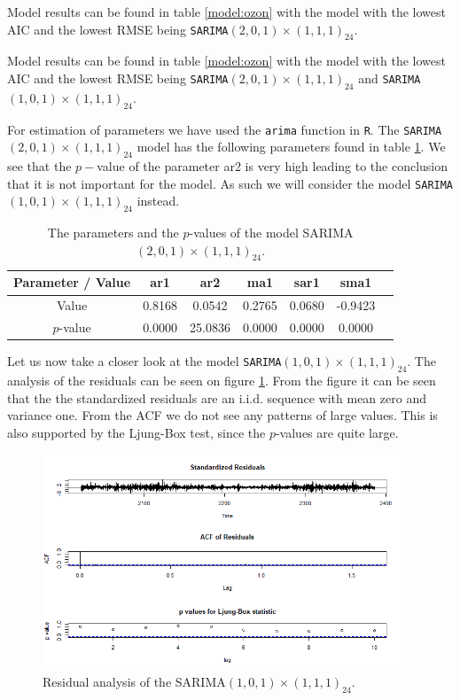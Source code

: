 \documentclass{article}
\begin{document}
Model results can be found in table \ref{model:ozon} with the model with the lowest AIC and the lowest RMSE being \verb|SARIMA|$(2,0,1) \times (1,1,1)_{24}$.

Model results can be found in table \ref{model:ozon} with the model with the lowest AIC and the lowest RMSE being \verb|SARIMA|$(2,0,1) \times (1,1,1)_{24}$ and \verb|SARIMA|$(1,0,1) \times (1,1,1)_{24}$.

For estimation of parameters we have used the \verb|arima| function in \verb|R|.  The \verb|SARIMA|$(2,0,1) \times (1,1,1)_{24}$ model has the following parameters found 
in table \ref{par:ozon}. We see that the $p-$value of the parameter ar2 is very high leading to the 
conclusion that it is not important for the model. As such we will consider the model \verb|SARIMA|$(1,0,1) \times (1,1,1)_{24}$ instead.


\begin{table}[ht!]
    \centering
    \begin{tabular}{|c|c|c|c|c|c|c|} \hline
        Parameter / Value & ar1 & ar2 & ma1 & sar1 & sma1  \\ \hline
        Value & 0.8168 & 0.0542 & 0.2765 & 0.0680 & -0.9423  \\ \hline
        $p$-value & 0.0000 & 25.0836 & 0.0000 & 0.0000 & 0.0000  \\ \hline
    \end{tabular}
    \caption{The parameters and the $p$-values of the model SARIMA$(2,0,1) \times (1,1,1)_{24}$.}
    \label{par:ozon}
\end{table}


Let us now take a closer look at the model \verb|SARIMA|$(1,0,1) \times (1,1,1)_{24}$. The analysis of the residuals
can be seen on figure  \ref{fig:res_o}. From the figure it can be seen that the the standardized 
residuals are an i.i.d. sequence with mean zero and variance one. From the ACF we do not see any 
patterns of large values. This is also supported by the Ljung-Box test, since the $p$-values are quite large.


\begin{figure}[ht!]
    \centering
    \includegraphics[width=0.95\textwidth]{Plots1/res_a.png}
    \caption{Residual analysis of the SARIMA$(1,0,1) \times (1,1,1)_{24}$.}
    \label{fig:res_o}
\end{figure}
\end{document}
